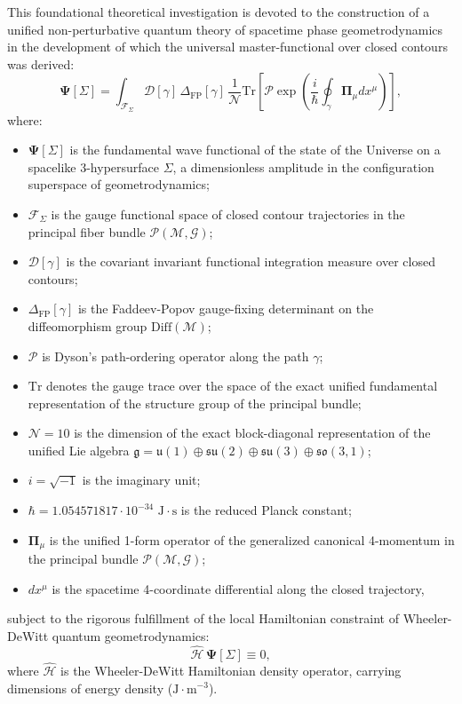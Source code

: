 \documentclass[11pt,a4paper]{article}
\theoremstyle{definition}
\begin{document}
This foundational theoretical investigation is devoted to the construction of a unified non-perturbative quantum theory of spacetime phase geometrodynamics in the development of which the universal master-functional over closed contours was derived:
\begin{equation}\label{eq:0.1}\tag{0.1}
\mathbf{\Psi}[\Sigma] = \int_{\mathcal{F}_\Sigma} \mathcal{D}[\gamma] \, \Delta_{\text{FP}}[\gamma] \, \frac{1}{\mathcal{N}} \text{Tr}\left[ \mathcal{P}\exp\left( \frac{i}{\hbar} \oint_{\gamma} \mathbf{\Pi}_\mu dx^\mu \right) \right],
\end{equation}
where:
\begin{itemize}
\item $\mathbf{\Psi}[\Sigma]$ is the fundamental wave functional of the state of the Universe on a spacelike 3-hypersurface $\Sigma$, a dimensionless amplitude in the configuration superspace of geometrodynamics;
\item $\mathcal{F}_\Sigma$ is the gauge functional space of closed contour trajectories in the principal fiber bundle $\mathcal{P}(\mathcal{M}, \mathcal{G})$;
\item $\mathcal{D}[\gamma]$ is the covariant invariant functional integration measure over closed contours;
\item $\Delta_{\text{FP}}[\gamma]$ is the Faddeev-Popov gauge-fixing determinant on the diffeomorphism group $\text{Diff}(\mathcal{M})$;
\item $\mathcal{P}$ is Dyson's path-ordering operator along the path $\gamma$;
\item $\text{Tr}$ denotes the gauge trace over the space of the exact unified fundamental representation of the structure group of the principal bundle;
\item $\mathcal{N} = 10$ is the dimension of the exact block-diagonal representation of the unified Lie algebra $\mathfrak{g} = \mathfrak{u}(1) \oplus \mathfrak{su}(2) \oplus \mathfrak{su}(3) \oplus \mathfrak{so}(3,1)$;
\item $i = \sqrt{-1}$ is the imaginary unit;
\item $\hbar = 1.054571817 \cdot 10^{-34}\text{ J}\cdot\text{s}$ is the reduced Planck constant;
\item $\mathbf{\Pi}_\mu$ is the unified 1-form operator of the generalized canonical 4-momentum in the principal bundle $\mathcal{P}(\mathcal{M}, \mathcal{G})$;
\item $dx^\mu$ is the spacetime 4-coordinate differential along the closed trajectory,
\end{itemize}
subject to the rigorous fulfillment of the local Hamiltonian constraint of Wheeler-DeWitt quantum geometrodynamics:
\begin{equation}\label{eq:0.2}\tag{0.2}
\hat{\mathcal{H}} \, \mathbf{\Psi}[\Sigma] \equiv 0,
\end{equation}
where $\hat{\mathcal{H}}$ is the Wheeler-DeWitt Hamiltonian density operator, carrying dimensions of energy density ($\text{J}\cdot\text{m}^{-3}$).
\end{document}
